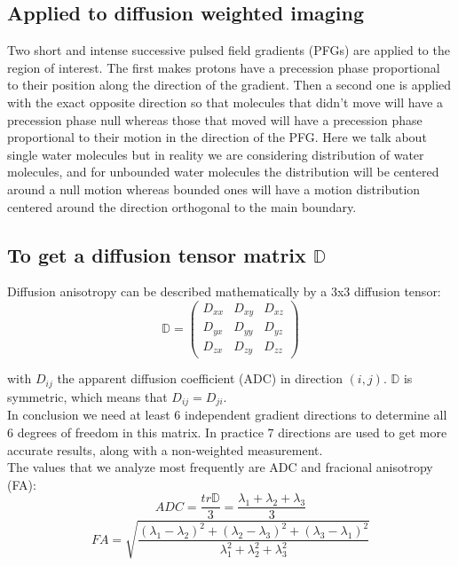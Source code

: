 \subsection{Applied to diffusion weighted imaging}

Two short and intense successive pulsed field gradients (PFGs) are applied to the region of interest. The first makes protons have a precession phase proportional to their position along the direction of the gradient. Then a second one is applied with the exact opposite direction so that molecules that didn't move will have a precession phase null whereas those that moved will have a precession phase proportional to their motion in the direction of the PFG. Here we talk about single water molecules but in reality we are considering distribution of water molecules, and for unbounded water molecules the distribution will be centered around a null motion whereas bounded ones will have a motion distribution centered around the direction orthogonal to the main boundary.

\subsection{To get a diffusion tensor matrix $\mathbb{D}$}

Diffusion anisotropy can be described mathematically by a 3x3 diffusion tensor:
\begin{equation}
    \mathbb{D} = \begin{pmatrix}
    D_{xx} & D_{xy} & D_{xz} \\
    D_{yx} & D_{yy} & D_{yz} \\
    D_{zx} & D_{zy} & D_{zz}
    \end{pmatrix}
\end{equation}

with $D_{ij}$ the apparent diffusion coefficient (ADC) in direction $(i, j)$. $\mathbb{D}$ is symmetric, which means that $D_{ij} = D_{ji}$.\\
In conclusion we need at least 6 independent gradient directions to determine all 6 degrees of freedom in this matrix. In practice 7 directions are used to get more accurate results, along with a non-weighted measurement.\\
The values that we analyze most frequently are ADC and fracional anisotropy (FA):
\begin{equation}
    ADC = \frac{tr{\mathbb{D}}}{3} = \frac{\lambda_1 + \lambda_2 + \lambda_3}{3}
\end{equation}
\begin{equation}
    FA = \sqrt{\frac{(\lambda_1 - \lambda_2)^2 + (\lambda_2 - \lambda_3)^2 + (\lambda_3 - \lambda_1)^2}{\lambda_1^2 + \lambda_2^2 + \lambda_3^2}}
\end{equation}


